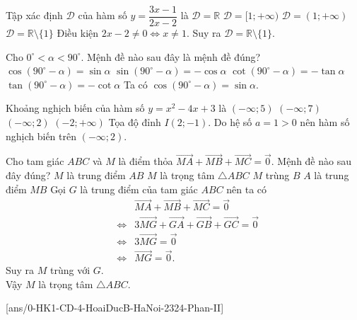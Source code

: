\begin{ex}%
	Tập xác định $\mathscr{D}$ của hàm số $y=\dfrac{3x-1}{2x-2}$ là
	\choice
	{$\mathscr{D}=\mathbb{R}$}
	{$\mathscr{D}=[1;+\infty)$}
	{$\mathscr{D}=(1;+\infty)$}
	{\True $\mathscr{D}=\mathbb{R}\setminus\{1\}$}
	\loigiai 
	{Điều kiện $2x-2\ne0 \Leftrightarrow x\ne1$. Suy ra $\mathscr{D}=\mathbb{R}\setminus\{1\}$.	
	}
\end{ex}
\begin{ex}%
	Cho $0^{\circ}<\alpha<90^{\circ}$. Mệnh đề nào sau đây là mệnh đề đúng?
	\choice
	{\True $\cos\left(90^{\circ}-\alpha\right)=\sin\alpha$}
	{$\sin\left(90^{\circ}-\alpha\right)=-\cos\alpha$}
	{$\cot\left(90^{\circ}-\alpha\right)=-\tan\alpha$}
	{$\tan\left(90^{\circ}-\alpha\right)=-\cot\alpha$}
	\loigiai 
	{Ta có $\cos\left(90^{\circ}-\alpha\right)=\sin\alpha$.
	}
\end{ex}
\begin{ex}%
	Khoảng nghịch biến của hàm số $y=x^2-4x+3$ là	
	\choice
	{$(-\infty;5)$}
	{$(-\infty;7)$}
	{\True $(-\infty;2)$}
	{$(-2;+\infty)$}
	\loigiai 
	{Tọa độ đỉnh $I(2;-1)$. Do hệ số $a=1>0$ nên hàm số nghịch biến trên $(-\infty;2)$. 			
	}
\end{ex}
\begin{ex}%
	Cho tam giác $ABC$ và $M$ là điểm thỏa $\overrightarrow{MA}+\overrightarrow{MB}+\overrightarrow{MC}=\overrightarrow{0}$. Mệnh đề nào sau đây đúng?
	\choice
	{$M$ là trung điểm $AB$}
	{\True $M$ là trọng tâm $\triangle ABC$}
	{$M$ trùng $B$}
	{$A$ là trung điểm $MB$}
	\loigiai 
	{Gọi $G$ là trung điểm của tam giác $ABC$ nên ta có
\begin{eqnarray*}
	& & \overrightarrow{MA}+\overrightarrow{MB}+\overrightarrow{MC}=\overrightarrow{0}\\
	&\Leftrightarrow & 3\overrightarrow{MG}+\overrightarrow{GA}+\overrightarrow{GB}+\overrightarrow{GC}=\overrightarrow{0}\\
	&\Leftrightarrow & 3\overrightarrow{MG}=\overrightarrow{0}\\
		&\Leftrightarrow & \overrightarrow{MG}=\overrightarrow{0}.
\end{eqnarray*}
Suy ra $M$ trùng với $G$.\\
 Vậy $M$ là trọng tâm $\triangle ABC$.
	}
\end{ex}
\cauds
{}[ans/0-HK1-CD-4-HoaiDucB-HaNoi-2324-Phan-II]
